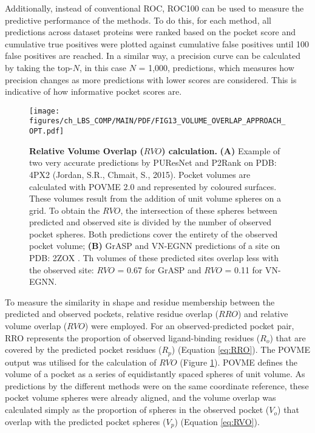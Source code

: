 Additionally, instead of conventional ROC, ROC100 \cite{WEBBER_2003_ROC100, SCOTT_2007_ROC100} can be used to measure the predictive performance of the methods. To do this, for each method, all predictions across dataset proteins were ranked based on the pocket score and cumulative true positives were plotted against cumulative false positives until 100 false positives are reached. In a similar way, a precision curve can be calculated by taking the top-$N$, in this case $N$ = 1,000, predictions, which measures how precision changes as more predictions with lower scores are considered. This is indicative of how informative pocket scores are.

\begin{figure}[htbp!]
    \centering
    \texttt{[image: figures/ch\_LBS\_COMP/MAIN/PDF/FIG13\_VOLUME\_OVERLAP\_APPROACH\_OPT.pdf]}
    \caption[Relative Volume Overlap ($RVO$) calculation]{\textbf{Relative Volume Overlap ($RVO$) calculation.} \textbf{(A)} Example of two very accurate predictions by PUResNet and P2Rank on PDB: 4PX2 (Jordan, S.R., Chmait, S., 2015). Pocket volumes are calculated with POVME 2.0 and represented by coloured surfaces. These volumes result from the addition of unit volume spheres on a grid. To obtain the $RVO$, the intersection of these spheres between predicted and observed site is divided by the number of observed pocket spheres. Both predictions cover the entirety of the observed pocket volume; \textbf{(B)} GrASP and VN-EGNN predictions of a site on PDB: 2ZOX \cite{NOGUCHI_2008_STRUCTURE}. Th volumes of these predicted sites overlap less with the observed site: $RVO$ = 0.67 for GrASP and $RVO$ = 0.11 for VN-EGNN.}
    \label{fig:protein_RVO_approach}
\end{figure}

\FloatBarrier

To measure the similarity in shape and residue membership between the predicted and observed pockets, relative residue overlap ($RRO$) and relative volume overlap ($RVO$) were employed. For an observed-predicted pocket pair, RRO represents the proportion of observed ligand-binding residues ($R_{o}$) that are covered by the predicted pocket residues ($R_{p}$) (Equation \ref{eq:RRO}). The POVME output was utilised for the calculation of $RVO$ (Figure \ref{fig:protein_RVO_approach}). POVME defines the volume of a pocket as a series of equidistantly spaced spheres of unit volume. As predictions by the different methods were on the same coordinate reference, these pocket volume spheres were already aligned, and the volume overlap was calculated simply as the proportion of spheres in the observed pocket ($V_{o}$) that overlap with the predicted pocket spheres ($V_{p}$) (Equation \ref{eq:RVO}).

